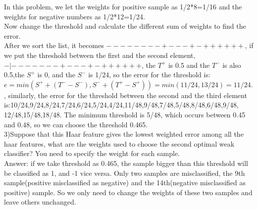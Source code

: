 \documentclass{article}
\begin{document}
In this problem, we let the weights for positive sample as 1/2*8=1/16 and the weights for negative numbers as 1/2*12=1/24. \\
Now change the threshold and calculate the different sum of weights to find the error. \\
After we sort the list, it becomes $- - - - - - - - + - - - + - + + + + + +$, if we put the threshold between the first and the second element, $- | - - - - - - - + - - - + - + + + + + +$, the $T^+$ is 0.5 and the $T^-$ is also 0.5,the $S^+$ is 0, and the $S^-$ is 1/24, so the error for the threshold is:$ e=min(S^++(T^--S^-),S^-+(T^+-S^+))=min(11/24,13/24)=11/24.$,
similarly, the error for the threshold between the second and the third element is:10/24,9/24,8/24,7/24,6/24,5/24,4/24,11/48,9/48,7/48,5/48,8/48,6/48,9/48,
12/48,15/48,18/48. The minimum threshold is 5/48, which occurs between 0.45 and 0.48, so we can choose the threshold 0.465.\\

3)Suppose that this Haar feature gives the lowest weighted error among all the haar features, what are the weights used to choose the second optimal weak classifier? You need to specify the weight for each sample.\\
Answer: if we take threshold as 0.465, the sample bigger than this threshold will be classified as 1, and -1 vice versa. Only two samples are misclassified,  the 9th sample(positive misclassified as negative) and the 14th(negative misclassified as positive) sample. So we only need to change the weights of these two samples and leave others unchanged.
\end{document}
